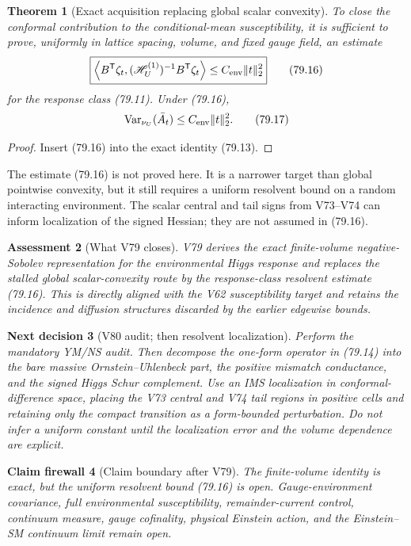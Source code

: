 \documentclass[11pt]{article}
\newtheorem{theorem}{Theorem}[section]
\newtheorem{firewall}[theorem]{Claim firewall}
\newtheorem{decision}[theorem]{Next decision}
\newtheorem{assessment}[theorem]{Assessment}
\theoremstyle{remark}
\begin{document}
\begin{theorem}[Exact acquisition replacing global scalar convexity]
\label{thm:v17v79-acquisition}
To close the conformal contribution to the conditional-mean
susceptibility, it is sufficient to prove, uniformly in lattice
spacing, volume, and fixed gauge field, an estimate
\[
\boxed{
 \left\langle
 B^{\mathsf T}\zeta_t,
 (\mathscr H_U^{(1)})^{-1}B^{\mathsf T}\zeta_t
 \right\rangle
 \leq C_{\rm env}\|t\|_2^2}                     \tag{79.16}
\]
for the response class (79.11).  Under (79.16),
\[
 \operatorname{Var}_{\nu_U}(\bar A_t)
 \leq C_{\rm env}\|t\|_2^2.                     \tag{79.17}
\]
\end{theorem}

\begin{proof}
Insert (79.16) into the exact identity (79.13).
\end{proof}

The estimate (79.16) is not proved here.  It is a narrower target than
global pointwise convexity, but it still requires a uniform resolvent
bound on a random interacting environment.  The scalar central and
tail signs from V73--V74 can inform localization of the signed Hessian;
they are not assumed in (79.16).

\begin{assessment}[What V79 closes]
\label{ass:v17v79-status}
V79 derives the exact finite-volume negative-Sobolev representation
for the environmental Higgs response and replaces the stalled global
scalar-convexity route by the response-class resolvent estimate
(79.16).  This is directly aligned with the V62 susceptibility target
and retains the incidence and diffusion structures discarded by the
earlier edgewise bounds.
\end{assessment}

\begin{decision}[V80 audit; then resolvent localization]
\label{dec:v17v79-next}
Perform the mandatory YM/NS audit.  Then decompose the one-form
operator in (79.14) into the bare massive Ornstein--Uhlenbeck part,
the positive mismatch conductance, and the signed Higgs Schur
complement.  Use an IMS localization in conformal-difference space,
placing the V73 central and V74 tail regions in positive cells and
retaining only the compact transition as a form-bounded perturbation.
Do not infer a uniform constant until the localization error and the
volume dependence are explicit.
\end{decision}

\begin{firewall}[Claim boundary after V79]
\label{fire:v17v79}
The finite-volume identity is exact, but the uniform resolvent bound
(79.16) is open.  Gauge-environment covariance, full environmental
susceptibility, remainder-current control, continuum measure, gauge
cofinality, physical Einstein action, and the Einstein--SM continuum
limit remain open.
\end{firewall}
\end{document}
